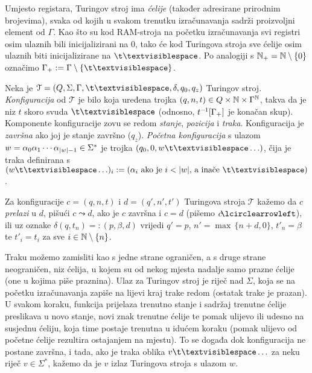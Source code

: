 Umjesto registara, Turingov stroj ima \emph{ćelije} (također adresirane prirodnim brojevima), svaka od kojih u svakom trenutku izračunavanja sadrži proizvoljni element od $\Gamma$. Kao što su kod RAM-stroja na početku izračunavanja svi registri osim ulaznih bili inicijalizirani na $0$, tako će kod Turingova stroja sve ćelije osim ulaznih biti inicijalizirane na $\bl$. Po analogiji s ${\mathbb N}_+={\mathbb N}\setminus\{0\}$ označimo $\Gamma_+:=\Gamma\setminus\{\bl\}$.

\begin{definicija}[{name=[Turing-konfiguracije i prijelazi među njima]}]
	Neka je $\mathcal T=(Q,\Sigma,\Gamma,\bl,\delta,q_0,q_z)$ Turingov stroj. \emph{Konfiguracija} od $\mathcal T$ je bilo koja uređena trojka $(q,n,t)\in Q\times{\mathbb N}\times\Gamma^{\mathbb N}$, takva da je niz $t$ skoro svuda $\bl$ (odnosno, $t^{-\mspace{-2mu}1}[\Gamma_+]$ je konačan skup). Komponente konfiguracije zovu se redom \emph{stanje}, \emph{pozicija} i \emph{traka}. Konfiguracija je \emph{završna} ako joj je stanje završno ($q_z$). \emph{Početna konfiguracija} s ulazom $w=\alpha_0\alpha_1\dotsm\alpha_{\lvert w\rvert-1}\in\Sigma^*$ je trojka $(q_0,0,w\bl\ldots)$, čija je traka definirana s $(w\bl\ldots)_i:=(\text{$\alpha_i$ ako je $i<\dulj w$, a inače $\bl$})$.%

	Za konfiguracije $c=(q,n,t)$ i $d=(q',n',t')$ Turingova stroja $\mathcal T$ kažemo da $c$ \emph{prelazi} u $d$, pišući $c\leadsto d$, ako je $c$ završna i $c=d$ (pišemo $c\!\lcirclearrowleft$), ili uz oznake $\delta(q,t_n)=:(p,\beta,d)$ vrijedi $q'=p$, $n'=\max\,\{n+d,0\}$, $t'_n=\beta$ te $t'_i=t_i$ za sve $i\in{\mathbb N}\setminus\{n\}$.
\end{definicija}

Traku možemo zamisliti kao s jedne strane ograničen, a s druge strane neograničen, niz ćelija, u kojem su od nekog mjesta nadalje samo prazne ćelije (one u kojima piše praznina). Ulaz za Turingov stroj je riječ nad $\Sigma$, koja se na početku izračunavanja zapiše na lijevi kraj trake redom (ostatak trake je prazan). U svakom koraku, funkcija prijelaza trenutno stanje i sadržaj trenutne ćelije preslikava u novo stanje, novi znak trenutne ćelije te pomak ulijevo ili udesno na susjednu ćeliju, koja time postaje trenutna u idućem koraku (pomak ulijevo od početne ćelije rezultira ostajanjem na mjestu). To se događa dok konfiguracija ne postane završna, i tada, ako je traka oblika $v\bl\ldots$ za neku riječ $v\in\Sigma^*$, kažemo da je $v$ izlaz Turingova stroja s ulazom $w$.

